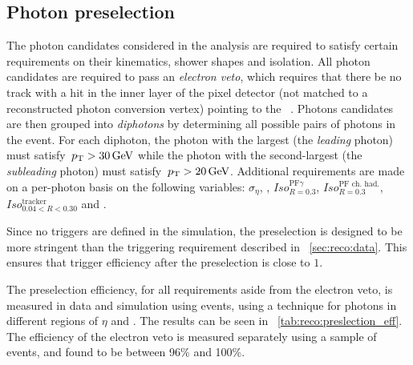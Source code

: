 \subsection{Photon preselection}
 \label{reco:sec:pho:preselection}

The photon candidates considered in the \Hgg analysis are required to satisfy certain requirements on their kinematics, shower shapes and isolation. All photon candidates are required to pass an \emph{electron veto}, which requires that there be no track with a hit in the inner layer of the pixel detector (not matched to a reconstructed photon conversion vertex) pointing to the \SC~\cite{CMS-PAS-EGM-14-001}. Photons candidates are then grouped into \emph{diphotons} by determining all possible pairs of photons in the event. For each diphoton, the photon with the largest \pT (the \emph{leading} photon) must satisfy $\,p_\text{T}>30\,\text{Ge\hspace{-.08em}V}$ while the photon with the second-largest \pT (the \emph{subleading} photon) must satisfy $\,p_\text{T}>20\,\text{Ge\hspace{-.08em}V}$. Additional requirements are made on a per-photon basis on the following variables: $\sigma_{\eta}$, \HoE, $Iso^{\textrm{PF}\gamma}_{R=0.3}$, $Iso^{\textrm{PF ch. had.}}_{R=0.3}$, $Iso^{\textrm{tracker}}_{0.04<R<0.30}$ and \RNINE. 

Since no triggers are defined in the simulation, the preselection is designed to be more stringent than the triggering requirement described in \Sec~\ref{sec:reco:data}. This ensures that trigger efficiency after the preselection is close to $1$.

The preselection efficiency, for all requirements aside from the electron veto, is measured in data and simulation using \Zee events, using a \TagAndProbe technique for photons in different regions of $\eta$ and \RNINE. The results can be seen in \Table~\ref{tab:reco:preslection_eff}. The efficiency of the electron veto is measured separately using a sample of \Zmmg events, and found to be between 96\% and 100\%.

